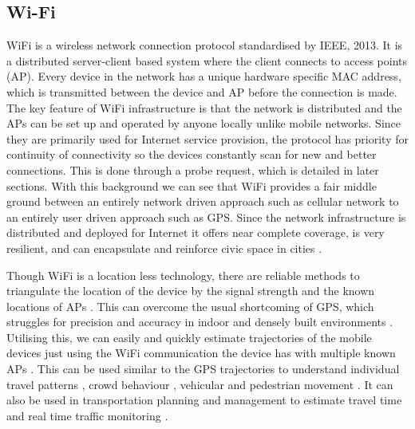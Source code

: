 \subsection{Wi-Fi}

WiFi is a wireless network connection protocol standardised by IEEE, 2013.
It is a distributed server-client based system where the client connects to access points (AP).
Every device in the network has a unique hardware specific MAC address, which is transmitted between the device and AP before the connection is made.
The key feature of WiFi infrastructure is that the network is distributed and the APs can be set up and operated by anyone locally unlike mobile networks.
Since they are primarily used for Internet service provision, the protocol has priority for continuity of connectivity so the devices constantly scan for new and better connections.
This is done through a probe request, which is detailed in later sections.
With this background we can see that WiFi provides a fair middle ground between an entirely network driven approach such as cellular network to an entirely user driven approach such as GPS.
Since the network infrastructure is distributed and deployed for Internet it offers near complete coverage, is very resilient,  and can encapsulate and reinforce civic space in cities \citep{torrens2008}.

Though WiFi is a location less technology, there are reliable methods to triangulate the location of the device by the signal strength and the known locations of APs \citep{he2003, moore2004, lamarca2005}.
This can overcome the usual shortcoming of GPS, which struggles for precision and accuracy in indoor and densely built environments \citep{zalampas2006, kawaguchi2009, xi2010}.
Utilising this, we can easily and quickly estimate trajectories of the mobile devices just using the WiFi communication the device has with multiple known APs \citep{sorensen2006}.
This can be used similar to the GPS trajectories to understand individual travel patterns \citep{kim2006, rekimoto2007, sapiezynska2015}, crowd behaviour \citep{abedi2013, mowafi2013}, vehicular \citep{lu2010} and pedestrian movement \citep{xu2013, fukuzaki2014, wang2016}.
It can also be used in transportation planning and management to estimate travel time \citep{musa2011} and real time traffic monitoring \citep{abbott-jard2013}.

